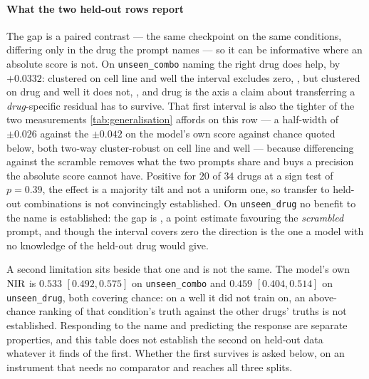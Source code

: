 \paragraph{What the two held-out rows report} The gap is a paired contrast --- the
same checkpoint on the same conditions, differing only in the drug the prompt
names --- so it can be informative where an absolute score is not. On
\texttt{unseen\_combo} naming the right drug does help, by $+0.0332$: clustered on
cell line and well the interval excludes zero, , but
clustered on drug and well it does not, , and drug
is the axis a claim about transferring a \emph{drug}-specific residual has to
survive. That first interval is also the tighter of the two measurements
\cref{tab:generalisation} affords on this row --- a half-width of $\pm 0.026$
against the $\pm 0.042$ on the model's own score against chance quoted below,
both two-way cluster-robust on cell line and well --- because differencing against
the scramble removes what the two prompts share and buys a precision the absolute
score cannot have. Positive for $20$ of $34$ drugs at a
sign test of $p = 0.39$, the effect is a majority tilt and not a uniform one, so
transfer to held-out combinations is not convincingly established. On \texttt{unseen\_drug}
no benefit to the name is established: the gap is
, a point estimate favouring the \emph{scrambled}
prompt, and though the interval covers zero the direction is the one a model with
no knowledge of the held-out drug would give.

A second limitation sits beside that one and is not the same. The model's own
$\textrm{NIR}$ is $0.533$ $[0.492, 0.575]$ on \texttt{unseen\_combo} and $0.459$
$[0.404, 0.514]$ on \texttt{unseen\_drug}, both covering chance: on a well it did
not train on, an above-chance ranking of that condition's truth against the
other drugs' truths is not established. Responding to the name and predicting
the response are separate properties, and this table does not establish the
second on held-out data whatever it finds of the first. Whether the first survives is asked
below, on an instrument that needs no comparator and reaches all three splits.

